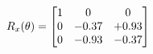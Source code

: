 \documentclass[preview]{standalone}
\begin{document}
\begin{align*}
\special{dvisvgm:raw <g id='unique000'>}R_{x}(\theta) = \begin{bmatrix}1 & 0 & 0 \\0 & -0.37 & +0.93 \\0 & -0.93 & -0.37\end{bmatrix}\special{dvisvgm:raw </g>}
\end{align*}
\end{document}
